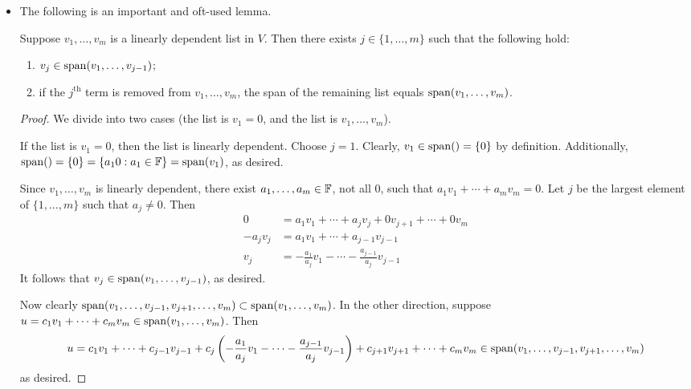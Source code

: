 \documentclass[../main.tex]{subfiles}
\begin{document}
\begin{itemize}
\begin{itemize}
    \end{itemize}
    \item The following is an important and oft-used lemma.
    \begin{lemma}
        Suppose $v_1,\dots,v_m$ is a linearly dependent list in $V$. Then there exists $j\in\{1,\dots,m\}$ such that the following hold:
        \begin{enumerate}[label={\textup{(}\alph*\textup{)}}]
            \item $v_j\in\operatorname{span}(v_1,\dots,v_{j-1})$;
            \item if the $j^\text{th}$ term is removed from $v_1,\dots,v_m$, the span of the remaining list equals $\operatorname{span}(v_1,\dots,v_m)$.
        \end{enumerate}
        \begin{proof}
            We divide into two cases (the list is $v_1=0$, and the list is $v_1,\dots,v_m$).\par\smallskip
            If the list is $v_1=0$, then the list is linearly dependent. Choose $j=1$. Clearly, $v_1\in\operatorname{span}()=\{0\}$ by definition. Additionally, $\operatorname{span}()=\{0\}=\{a_10:a_1\in\mathbb{F}\}=\operatorname{span}(v_1)$, as desired.\par\smallskip
            Since $v_1,\dots,v_m$ is linearly dependent, there exist $a_1,\dots,a_m\in\mathbb{F}$, not all 0, such that $a_1v_1+\cdots+a_mv_m=0$. Let $j$ be the largest element of $\{1,\dots,m\}$ such that $a_j\neq 0$. Then
            \begin{align*}
                0 &= a_1v_1+\cdots+a_jv_j+0v_{j+1}+\cdots+0v_m\\
                -a_jv_j &= a_1v_1+\cdots+a_{j-1}v_{j-1}\\
                v_j &= -\frac{a_1}{a_j}v_1-\cdots-\frac{a_{j-1}}{a_j}v_{j-1}
            \end{align*}
            It follows that $v_j\in\operatorname{span}(v_1,\dots,v_{j-1})$, as desired.\par
            Now clearly $\operatorname{span}(v_1,\dots,v_{j-1},v_{j+1},\dots,v_m)\subset\operatorname{span}(v_1,\dots,v_m)$. In the other direction, suppose $u=c_1v_1+\cdots+c_mv_m\in\operatorname{span}(v_1,\dots,v_m)$. Then
            \begin{equation*}
                u = c_1v_1+\cdots+c_{j-1}v_{j-1}+c_j\left( -\frac{a_1}{a_j}v_1-\cdots-\frac{a_{j-1}}{a_j}v_{j-1} \right)+c_{j+1}v_{j+1}+\cdots+c_mv_m\in\operatorname{span}(v_1,\dots,v_{j-1},v_{j+1},\dots,v_m)
            \end{equation*}
            as desired.
        \end{proof}

\end{lemma}
\end{itemize}
\end{document}
